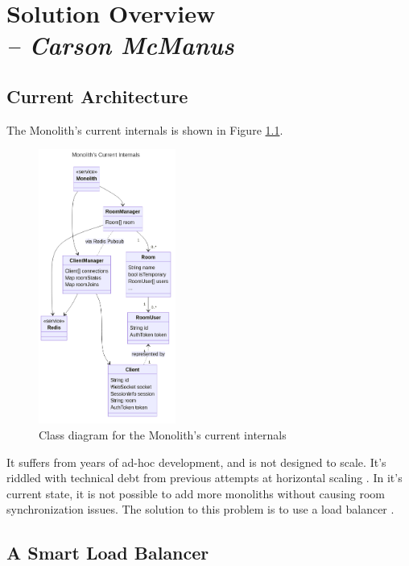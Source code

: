 \chapter{Solution Overview \\
  \small{\textit{-- Carson McManus}}
  \label{Chapter::SolutionOverview}}

\section{Current Architecture}

The Monolith's  current internals is shown in Figure \ref{fig:monolith-class-current}.

\begin{figure}[!h]
  \centering
  \includegraphics[width=0.4\textwidth]{Figures/monolith-class-current.png}
  \caption{Class diagram for the Monolith's current internals}
  \label{fig:monolith-class-current}
\end{figure}

It suffers from years of ad-hoc development, and is not designed to scale. It's riddled with technical debt from previous attempts at horizontal scaling . In it's current state, it is not possible to add more monoliths without causing room synchronization issues. The solution to this problem is to use a load balancer .

\section{A Smart Load Balancer}

